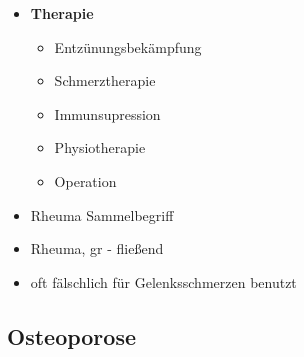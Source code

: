 \begin{itemize}
		\item \textbf{Therapie}
			\begin{itemize}
				\item Entzünungsbekämpfung
				\item Schmerztherapie
				\item Immunsupression
				\item Physiotherapie
				\item Operation
			\end{itemize}
		\item Rheuma Sammelbegriff
		\item Rheuma, gr - fließend
		\item oft fälschlich für Gelenksschmerzen benutzt
 	\end{itemize}

\subsection{Osteoporose}
